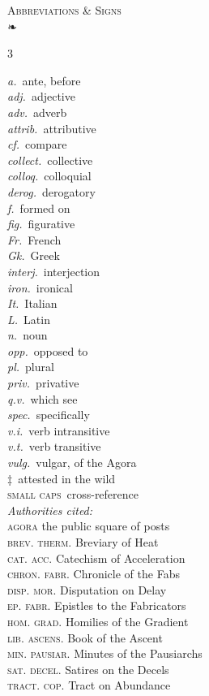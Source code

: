 \documentclass[10pt,twoside]{article}
\newcommand\src[1]{{\scshape\MakeLowercase{#1}}} %
\begin{document}
\vspace{5mm}
\begin{center}
{\dispfont\large\scshape Abbreviations \& Signs}\\[2pt]
{\color{rubric}❧}
\end{center}
\vspace{1mm}
\begin{multicols}{3}
\footnotesize
\raggedright
\textit{a.}\ ante, before\\
\textit{adj.}\ adjective\\
\textit{adv.}\ adverb\\
\textit{attrib.}\ attributive\\
\textit{cf.}\ compare\\
\textit{collect.}\ collective\\
\textit{colloq.}\ colloquial\\
\textit{derog.}\ derogatory\\
\textit{f.}\ formed on\\
\textit{fig.}\ figurative\\
\textit{Fr.}\ French\\
\textit{Gk.}\ Greek\\
\textit{interj.}\ interjection\\
\textit{iron.}\ ironical\\
\textit{It.}\ Italian\\
\textit{L.}\ Latin\\
\textit{n.}\ noun\\
\textit{opp.}\ opposed to\\
\textit{pl.}\ plural\\
\textit{priv.}\ privative\\
\textit{q.v.}\ which see\\
\textit{spec.}\ specifically\\
\textit{v.i.}\ verb intransitive\\
\textit{v.t.}\ verb transitive\\
\textit{vulg.}\ vulgar, of the Agora\\
\textcolor{rubric}{‡}\ attested in the wild\\
\textsc{small caps}\ cross-reference\\[4pt]
\textit{Authorities cited:}\\
\src{Agora} the public square of posts\\
\src{Brev. Therm.} Breviary of Heat\\
\src{Cat. Acc.} Catechism of Acceleration\\
\src{Chron. Fabr.} Chronicle of the Fabs\\
\src{Disp. Mor.} Disputation on Delay\\
\src{Ep. Fabr.} Epistles to the Fabricators\\
\src{Hom. Grad.} Homilies of the Gradient\\
\src{Lib. Ascens.} Book of the Ascent\\
\src{Min. Pausiar.} Minutes of the Pausiarchs\\
\src{Sat. Decel.} Satires on the Decels\\
\src{Tract. Cop.} Tract on Abundance
\end{multicols}
\end{document}
